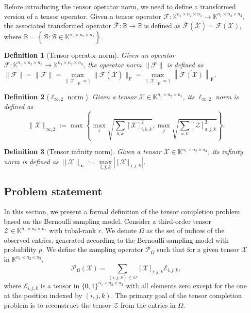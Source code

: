 \documentclass[twoside,12pt]{article}
\newtheorem{definition}{Definition}
\def\fro{{\mathrm{F}}}
\def\fro{{\mathrm{F}}}
\begin{document}
Before introducing the tensor operator norm, we need to define a transformed version of a tensor operator. 
Given a tensor operator $\mathcal{F}:\mathbb{K}^{n_1\times n_2 \times n_3} \rightarrow \mathbb{K}^{n_1\times n_2\times n_3}$, the associated transformed operator $\overline{\mathcal{F}}: \mathbb{B} \rightarrow \mathbb{B}$ is defined as $\overline{\mathcal{\mathcal{F}}}(\overline{\mathcal{X}}) = \overline{\mathcal{F}(\mathcal{X})}$, where $\mathbb{B}=\left\{\overline{\mathcal{B}}: \mathcal{B} \in \mathbb{K}^{n_1 \times n_2 \times n_3}\right\}$. 
 
\begin{definition}[Tensor operator norm]\label{def:tensor-operator-norm}
Given an operator $\mathcal{F}:\mathbb{K}^{n_1\times n_2 \times n_3} \rightarrow \mathbb{K}^{n_1\times n_2\times n_3}$, the operator norm $\|\mathcal{F}\|$ is defined as $\|\mathcal{F}\| = \|\overline{\mathcal{F}}\| = \max\limits_{\|\overline{\mathcal{X}}\|_{\fro}=1}\|\overline{\mathcal{F}}(\overline{\mathcal{X}})\|_{\fro}=\max\limits_{\|\overline{\mathcal{X}}\|_{\fro}=1}\left\|\overline{\mathcal{F}(\mathcal{X})}\right\|_{\fro}$.
\end{definition}
\begin{definition}[$\ell_{\infty,2}$ norm \citep{zhang2017exact}] Given a tensor $\mathcal{X}\in \mathbb{K}^{n_1\times n_2 \times n_3}$, its $\ell_{\infty,2}$ norm is defined as 
$$\|\mathcal{X}\|_{\infty,2}:=\max\left\{\max\limits_{i}\sqrt{\sum\limits_{b,k}[\mathcal{X}]_{i,b,k}^2}, \max\limits_{j}\sqrt{\sum\limits_{a,k}[\mathcal{Z}]_{a,j,k}^2}\right\}.
$$
\end{definition}
\begin{definition}[Tensor infinity norm]Given a tensor $\mathcal{X}\in \mathbb{K}^{n_1\times n_2\times n_3}$, its  infinity norm  is defined as $\|\mathcal{X}\|_{\infty}:=\max\limits_{i,j,k} |[\mathcal{X}]_{i,j,k}|$.
\end{definition}
\subsection{Problem statement}
In this section, we present a formal definition of the tensor completion problem based on the Bernoulli sampling model. Consider a third-order tensor \( \mathcal{Z} \in \mathbb{K}^{n_1 \times n_2 \times n_3} \) with  tubal-rank   \( r \). We denote $\Omega$ as the set of indices of the observed entries, generated according to the Bernoulli sampling model with probability $p$. 
We define the sampling operator $\mathcal{P}_{\Omega}$ such that for a given tensor $\mathcal{X}$ in $\mathbb{K}^{n_1 \times n_2 \times n_3}$, \[\mathcal{P}_{\Omega}(\mathcal{X})=\sum_{(i,j,k)\in \Omega}[\mathcal{X}]_{i,j,k}\mathcal{E}_{i,j,k},\]
where  $\mathcal{E}_{i,j,k}$ is a tensor in $\{0,1\}^{n_1 \times n_2 \times n_3}$ with all elements zero except for the one at the position indexed by $(i,j,k)$. The primary goal of the tensor completion problem is to reconstruct the tensor \( \mathcal{Z} \) from the entries in $\Omega$. 
\end{document}
